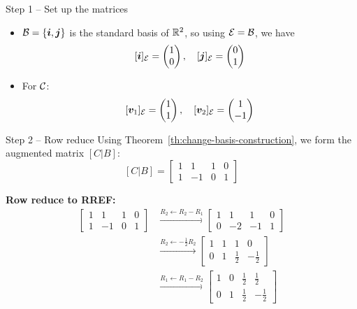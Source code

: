 \documentclass[aspectratio=169]{beamer}\usepackage[]{graphicx}\usepackage[]{xcolor}
\begin{document}
\begin{frame}{Step 1 -- Set up the matrices}
\begin{itemize}
\item $\mathcal{B}=\{\bm{i},\bm{j}\}$ is the standard basis of $\mathbb{R}^2$, so using $\mathcal{E}=\mathcal{B}$, we have 
\[
[\bm{i}]_{\mathcal{E}} = \begin{pmatrix} 1 \\ 0 \end{pmatrix}, \quad [\bm{j}]_{\mathcal{E}} = \begin{pmatrix} 0 \\ 1 \end{pmatrix}
\]
\item For $\mathcal{C}$: 
\[
[\bm{v}_1]_{\mathcal{E}} = \begin{pmatrix} 1 \\ 1 \end{pmatrix}, \quad [\bm{v}_2]_{\mathcal{E}} = \begin{pmatrix} 1 \\ -1 \end{pmatrix}
\]
\end{itemize}
\end{frame}

\begin{frame}{Step 2 -- Row reduce}
Using Theorem~\ref{th:change-basis-construction}, we form the augmented matrix $[C|B]$:
$$[C|B] = \left[\begin{array}{cc|cc} 1 & 1 & 1 & 0 \\ 1 & -1 & 0 & 1 \end{array}\right]$$

\vfill
\textbf{Row reduce to RREF:}
\begin{align*}
\left[\begin{array}{cc|cc} 1 & 1 & 1 & 0 \\ 1 & -1 & 0 & 1 \end{array}\right] &\xrightarrow{R_2 \leftarrow R_2 - R_1} \left[\begin{array}{cc|cc} 1 & 1 & 1 & 0 \\ 0 & -2 & -1 & 1 \end{array}\right] \\
&\xrightarrow{R_2 \leftarrow -\frac{1}{2}R_2} \left[\begin{array}{cc|cc} 1 & 1 & 1 & 0 \\ 0 & 1 & \frac{1}{2} & -\frac{1}{2} \end{array}\right] \\
&\xrightarrow{R_1 \leftarrow R_1 - R_2} \left[\begin{array}{cc|cc} 1 & 0 & \frac{1}{2} & \frac{1}{2} \\ 0 & 1 & \frac{1}{2} & -\frac{1}{2} \end{array}\right]
\end{align*}
\end{frame}
\end{document}
